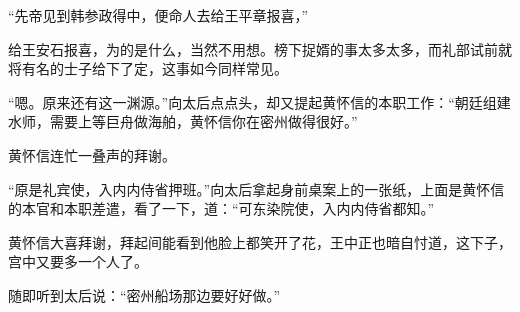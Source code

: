 “先帝见到韩参政得中，便命人去给王平章报喜，”

给王安石报喜，为的是什么，当然不用想。榜下捉婿的事太多太多，而礼部试前就将有名的士子给下了定，这事如今同样常见。

“嗯。原来还有这一渊源。”向太后点点头，却又提起黄怀信的本职工作：“朝廷组建水师，需要上等巨舟做海舶，黄怀信你在密州做得很好。”

黄怀信连忙一叠声的拜谢。

“原是礼宾使，入内内侍省押班。”向太后拿起身前桌案上的一张纸，上面是黄怀信的本官和本职差遣，看了一下，道：“可东染院使，入内内侍省都知。”

黄怀信大喜拜谢，拜起间能看到他脸上都笑开了花，王中正也暗自忖道，这下子，宫中又要多一个人了。

随即听到太后说：“密州船场那边要好好做。”
